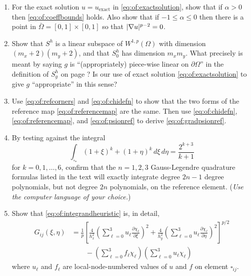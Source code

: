\begin{enumerate}
\item \label{exer:of:checkexactbounds}  For the exact solution $u=u_{\text{exact}}$ in \eqref{eq:of:exactsolution}, show that if $\alpha>0$ then \eqref{eq:of:coeffbounds} holds.  Also show that if $-1 \le \alpha \le 0$ then there is a point in $\bar\Omega=[0,1]\times[0,1]$ so that $|\nabla u|^{p-2}=0$.

\item Show that $S^h$ is a linear subspace of $W^{1,p}(\Omega)$ with dimension $(m_x+2)(m_y+2)$, and that $S_0^h$ has dimension $m_x m_y$.  What precisely is meant by saying $g$ is ``(appropriately) piece-wise linear on $\partial\Omega$'' in the definition of $S_g^h$ on page \pageref{eq:of:Sghdefn}?  Is our use of exact solution \eqref{eq:of:exactsolution} to give $g$ ``appropriate'' in this sense?

\item  Use \eqref{eq:of:refcorners} and \eqref{eq:of:chidefn} to show that the two forms of the reference map \eqref{eq:of:referencemap} are the same.  Then use \eqref{eq:of:chidefn}, \eqref{eq:of:referencemap}, and \eqref{eq:of:psionref} to derive \eqref{eq:of:gradpsionref}.

\item By testing against the integral
    $$\int_{\square_\ast} (1+\xi)^k + (1+\eta)^k\,d\xi\, d\eta = \frac{2^{k+3}}{k+1}$$
for $k=0,1,\dots,6$, confirm that the $n=1,2,3$ Gauss-Legendre quadrature formulas listed in the text will exactly integrate degree $2n-1$ degree polynomials, but not degree $2n$ polynomials, on the reference element.  (\emph{Use the computer language of your choice.})

\item \label{exer:of:integrand}  Show that \eqref{eq:of:integrandheuristic} is, in detail,
\begin{align*}
G_{ij}(\xi,\eta) &= \frac{1}{p} \left[\frac{4}{h_x^2} \left(\sum_{\ell=0}^3 u_\ell \frac{\partial\chi_\ell}{\partial \xi}\right)^2 + \frac{4}{h_y^2} \left(\sum_{\ell=0}^3 u_\ell \frac{\partial\chi_\ell}{\partial \eta}\right)^2\right]^{p/2} \\
  &\qquad - \left(\sum_{\ell=0}^3 f_\ell \chi_\ell\right) \left(\sum_{\ell=0}^3 u_\ell \chi_\ell\right)
\end{align*}
where $u_\ell$ and $f_\ell$ are local-node-numbered values of $u$ and $f$ on element $\square_{ij}$.


\end{enumerate}
